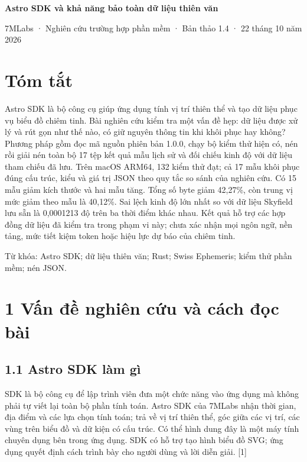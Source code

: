 \documentclass[11pt,a4paper]{article}
\begin{document}
\fontsize{11}{12.7}\selectfont

\begin{center}{\fontsize{14}{17}\selectfont\bfseries Astro SDK và khả năng bảo toàn dữ liệu thiên văn\par}\end{center}
\begin{center}\fontsize{10}{12}\selectfont 7MLabs · Nghiên cứu trường hợp phần mềm · Bản thảo 1.4 · 22 tháng 10 năm 2026\end{center}
\section*{Tóm tắt}
Astro SDK là bộ công cụ giúp ứng dụng tính vị trí thiên thể và tạo dữ liệu phục vụ biểu đồ chiêm tinh. Bài nghiên cứu kiểm tra một vấn đề hẹp: dữ liệu được xử lý và rút gọn như thế nào, có giữ nguyên thông tin khi khôi phục hay không? Phương pháp gồm đọc mã nguồn phiên bản 1.0.0, chạy bộ kiểm thử hiện có, nén rồi giải nén toàn bộ 17 tệp kết quả mẫu lịch sử và đối chiếu kinh độ với dữ liệu tham chiếu đã lưu. Trên macOS ARM64, 132 kiểm thử đạt; cả 17 mẫu khôi phục đúng cấu trúc, kiểu và giá trị JSON theo quy tắc so sánh của nghiên cứu. Có 15 mẫu giảm kích thước và hai mẫu tăng. Tổng số byte giảm 42,27\%, còn trung vị mức giảm theo mẫu là 40,12\%. Sai lệch kinh độ lớn nhất so với dữ liệu Skyfield lưu sẵn là 0,0001213 độ trên ba thời điểm khác nhau. Kết quả hỗ trợ các hợp đồng dữ liệu đã kiểm tra trong phạm vi này; chưa xác nhận mọi ngôn ngữ, nền tảng, mức tiết kiệm token hoặc hiệu lực dự báo của chiêm tinh.


Từ khóa: Astro SDK; dữ liệu thiên văn; Rust; Swiss Ephemeris; kiểm thử phần mềm; nén JSON.


\section*{1 Vấn đề nghiên cứu và cách đọc bài}
\subsection*{1.1 Astro SDK làm gì}
SDK là bộ công cụ để lập trình viên đưa một chức năng vào ứng dụng mà không phải tự viết lại toàn bộ phần tính toán. Astro SDK của 7MLabs nhận thời gian, địa điểm và các lựa chọn tính toán; trả về vị trí thiên thể, góc giữa các vị trí, các vùng trên biểu đồ và dữ kiện có cấu trúc. Có thể hình dung đây là một máy tính chuyên dụng bên trong ứng dụng. SDK có hỗ trợ tạo hình biểu đồ SVG; ứng dụng quyết định cách trình bày cho người dùng và lời diễn giải. [1]
\end{document}
